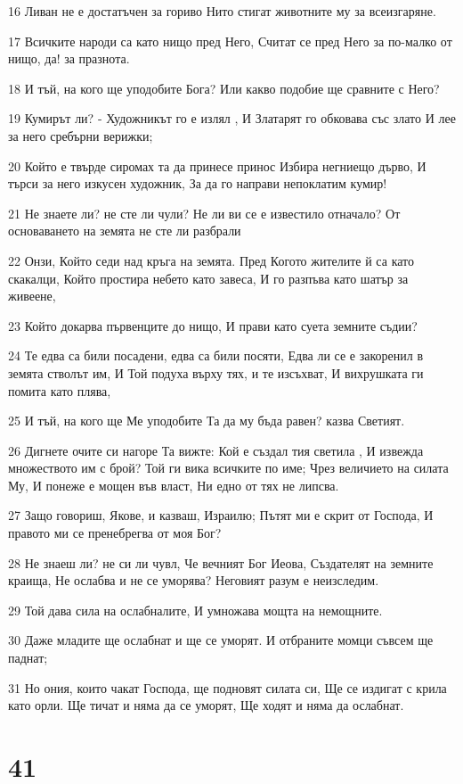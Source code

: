 \par 16 Ливан не е достатъчен за гориво Нито стигат животните му за всеизгаряне.
\par 17 Всичките народи са като нищо пред Него, Считат се пред Него за по-малко от нищо, да! за празнота.
\par 18 И тъй, на кого ще уподобите Бога? Или какво подобие ще сравните с Него?
\par 19 Кумирът ли? - Художникът го е излял , И Златарят го обковава със злато И лее за него сребърни верижки;
\par 20 Който е твърде сиромах та да принесе принос Избира негниещо дърво, И търси за него изкусен художник, За да го направи непоклатим кумир!
\par 21 Не знаете ли? не сте ли чули? Не ли ви се е известило отначало? От основаването на земята не сте ли разбрали
\par 22 Онзи, Който седи над кръга на земята. Пред Когото жителите й са като скакалци, Който простира небето като завеса, И го разпъва като шатър за живеене,
\par 23 Който докарва първенците до нищо, И прави като суета земните съдии?
\par 24 Те едва са били посадени, едва са били посяти, Едва ли се е закоренил в земята стволът им, И Той подуха върху тях, и те изсъхват, И вихрушката ги помита като плява,
\par 25 И тъй, на кого ще Ме уподобите Та да му бъда равен? казва Светият.
\par 26 Дигнете очите си нагоре Та вижте: Кой е създал тия светила , И извежда множеството им с брой? Той ги вика всичките по име; Чрез величието на силата Му, И понеже е мощен във власт, Ни едно от тях не липсва.
\par 27 Защо говориш, Якове, и казваш, Израилю; Пътят ми е скрит от Господа, И правото ми се пренебрегва от моя Бог?
\par 28 Не знаеш ли? не си ли чувл, Че вечният Бог Иеова, Създателят на земните краища, Не ослабва и не се уморява? Неговият разум е неизследим.
\par 29 Той дава сила на ослабналите, И умножава мощта на немощните.
\par 30 Даже младите ще ослабнат и ще се уморят. И отбраните момци съвсем ще паднат;
\par 31 Но ония, които чакат Господа, ще подновят силата си, Ще се издигат с крила като орли. Ще тичат и няма да се уморят, Ще ходят и няма да ослабнат.

\chapter{41}

